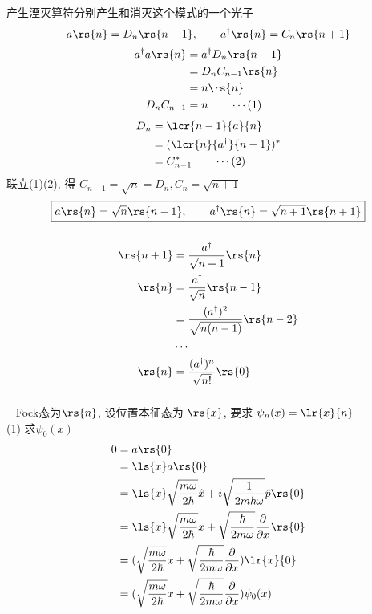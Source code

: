 \begin{frame}
    \frametitle{}
    产生湮灭算符分别产生和消灭这个模式的一个光子
    \[ {a \rs{n}= D_n\rs{n-1}}, \qquad a^\dagger \rs{n}= C_n \rs{n+1} \]  
    \[ 
      \begin{aligned}
        a^\dagger a \rs{n} &= a^\dagger D_n\rs{n-1} \\ 
        &= D_n C_{n-1} \rs{n}  \\
        &= n \rs{n} \\ 
        D_n C_{n-1}&=n \qquad \cdots (1)
      \end{aligned}
      \] 
      \[ 
        \begin{aligned}
          D_n &=  \lcr{n-1}{a}{n} \\
          &=  (\lcr{n}{a^\dagger }{n-1})^* \\
          &= C_{n-1} ^*   \qquad \cdots (2)
        \end{aligned}
        \] 
        联立(1)(2), 得 $C_{n-1}=\sqrt{n}= D_n, C_{n}=\sqrt{n+1} $\\  
        \[\boxed{ {a \rs{n}= \sqrt{n}\rs{n-1}}, \qquad a^\dagger \rs{n}= \sqrt{n+1} \rs{n+1}} \]   
\end{frame}

\begin{frame}
    \frametitle{}
    \[ 
  \begin{aligned}
      \rs{n+1} &= \frac{a^\dagger }{\sqrt{n+1}} \rs{n} \\
      \rs{n} &= \frac{a^\dagger }{\sqrt{n}} \rs{n-1} \\
             &= \frac{(a^\dagger)^2 }{\sqrt{n(n-1)}} \rs{n-2} \\
             & \cdots \\
      \rs{n} &= \frac{(a^\dagger)^n }{\sqrt{n!}} \rs{0} \\
  \end{aligned}    
    \]
\end{frame}

\begin{frame}
    \frametitle{}
    \例 [12. 求Fock态在位置表象中的波函数]{}
    \解~ Fock态为$\rs{n}$, 设位置本征态为 $\rs{x}$, 要求 $\psi_n (x)=\lr{x}{n} $  \\
    (1) 求$\psi_0 (x)$
    \[ 
  \begin{aligned}
    0 &= a \rs{0}  \\ 
    &= \ls{x} a \rs{0}  \\ 
    &= \ls{x} \sqrt{\frac{m\omega}{2\hbar}}\hat{x} + i \sqrt{\frac{1}{2 m \hbar \omega}} \hat{p} \rs{0}  \\ 
    &= \ls{x} \sqrt{\frac{m\omega}{2\hbar}} x + \sqrt{\frac{\hbar}{2 m \omega}} \frac{\partial }{\partial x } \rs{0}  \\ 
    &= (\sqrt{\frac{m\omega}{2\hbar}} x + \sqrt{\frac{\hbar}{2 m \omega}} \frac{\partial }{\partial x } )\lr{x}{0}  \\ 
    &= (\sqrt{\frac{m\omega}{2\hbar}} x + \sqrt{\frac{\hbar}{2 m \omega}} \frac{\partial }{\partial x } ) \psi_0 (x) \\ 
  \end{aligned} \] 
  
\end{frame}

